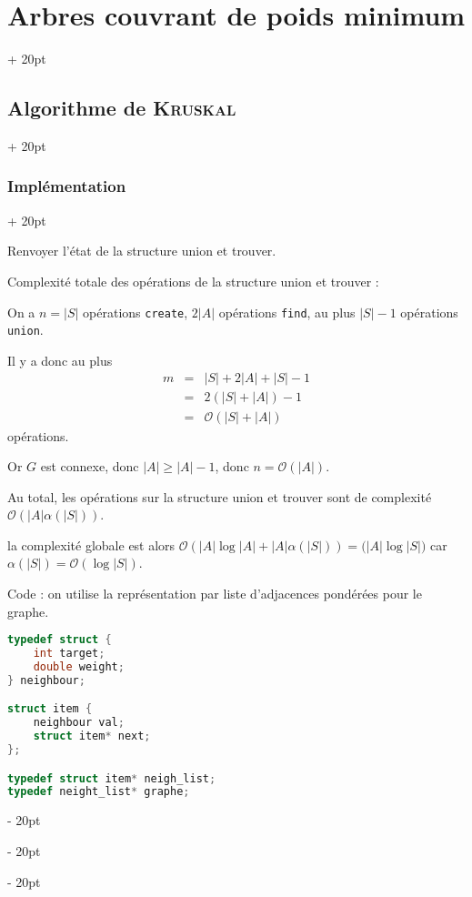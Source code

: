 \documentclass[a4paper, 12pt, twoside]{article}
\newcommand{\abs}[1]{\left\lvert #1 \right\rvert}
\renewcommand{\ge}{\geqslant}
\newcommand{\ind}[1][20pt]{\advance\leftskip + #1}
\newcommand{\deind}[1][20pt]{\advance\leftskip - #1}
\newenvironment{indt}[2][20pt]{#2 \par \ind[#1]}{\par \deind} %
\begin{document}
\begin{indt}{\section{Arbres couvrant de poids minimum}}
\begin{indt}{\subsection{Algorithme de \textsc{Kruskal}}}
\begin{indt}{\subsubsection{Implémentation}}
\begin{pseudocode}
                    \vspace{6pt}
                    
                    Renvoyer l'état de la structure union et trouver.
                \end{pseudocode}

                \vspace{12pt}
                
                Complexité totale des opérations de la structure union et trouver :

                On a $n = \abs S$ opérations \texttt{create},
                $2 \abs A$ opérations \texttt{find},
                au plus $\abs S - 1$ opérations \texttt{union}.

                Il y a donc au plus
                \[
                    \begin{array}{rcl}
                        m
                        &=&
                        \abs S + 2\abs A + \abs S - 1
                        \\
                        &=& 2(\abs S + \abs A) - 1
                        \\
                        &=& \mathcal O(\abs S + \abs A)
                    \end{array}
                \]
                opérations.

                Or $G$ est connexe, donc $\abs A \ge \abs A - 1$, donc $n = \mathcal O(\abs A)$.

                Au total, les opérations sur la structure union et trouver sont de complexité $\mathcal O(\abs A \alpha(\abs S))$.

                la complexité globale est alors $\mathcal O(\abs A \log \abs A + \abs A \alpha(\abs S)) = \mathcal(\abs A \log \abs S)$ car $\alpha(\abs S) = \mathcal O(\log \abs S)$.

                \vspace{12pt}
                
                Code : on utilise la représentation par liste d'adjacences pondérées pour le graphe.

                \begin{lstlisting}[language=C, xleftmargin=80pt]
typedef struct {
    int target;
    double weight;
} neighbour;

struct item {
    neighbour val;
    struct item* next;
};

typedef struct item* neigh_list;
typedef neight_list* graphe;


\end{lstlisting}
\end{indt}
\end{indt}
\end{indt}
\end{document}
